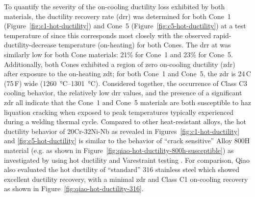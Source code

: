 {To quantify the severity of the on-cooling ductility loss exhibited by both materials, the ductility recovery rate (\gls{drr}) was determined for both Cone~1 (Figure~\ref{fig:c1-hot-ductility}) and Cone~5 (Figure~\ref{fig:c5-hot-ductility}) at a test temperature of  since this corresponds most closely with the observed rapid-ductility-decrease temperature (on-heating) for both Cones.  The \gls{drr} at  was similarly low for both Cone materials: 21\% for Cone~1 and 23\% for Cone~5.  Additionally, both Cones exhibited a region of zero on-cooling ductility (\gls{zdr}) after exposure to the on-heating \gls{zdt}; for both Cone~1 and Cone~5, the \gls{zdr} is 24\,C\textdegree{} (75\,F\textdegree{}) wide (\SIrange[range-phrase=--]{1260}{1301}{\degreeCelsius}).  Considered together, the occurrence of Class C3 cooling behavior, the relatively low \gls{drr} values, and the presence of a significant \gls{zdr} all indicate that the Cone~1 and Cone~5 materials are both susceptible to \gls{haz} liquation cracking when exposed to peak temperatures typically experienced during a welding thermal cycle. Compared to other heat-resistant alloys, the hot ductility behavior of 20Cr-32Ni-Nb as revealed in Figures~\ref{fig:c1-hot-ductility} and \ref{fig:c5-hot-ductility} is similar to the behavior of ``crack sensitive'' Alloy 800H material (e.g. as shown in Figure~\ref{fig:qiao-hot-ductility-800h-susceptible}) as investigated by \citet{qiao_weldability_1993} using hot ductility and Varestraint testing \cite{lundin_varestraint_1965}. For comparison, Qiao also evaluated the hot ductility of ``standard'' 316 stainless steel which showed excellent ductility recovery, with a minimal \gls{zdr} and Class C1 on-cooling recovery as shown in Figure~\ref{fig:qiao-hot-ductility-316}.

}

